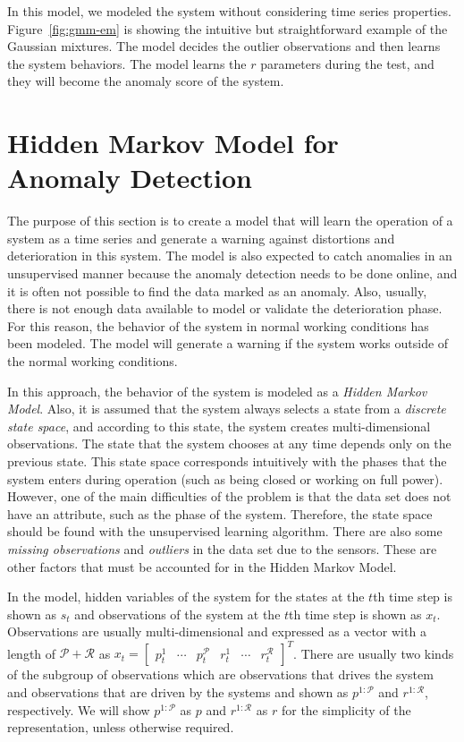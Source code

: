 In this model, we modeled the system without considering time series properties. Figure~\ref{fig:gmm-em} is showing the intuitive but straightforward example of the Gaussian mixtures. The model decides the outlier observations and then learns the system behaviors. The model learns the $r$ parameters during the test, and they will become the anomaly score of the system.

\section{Hidden Markov Model for Anomaly Detection}

The purpose of this section is to create a model that will learn the operation of a system as a time series and generate a warning against distortions and deterioration in this system. 
The model is also expected to catch anomalies in an unsupervised manner because the anomaly detection needs to be done online, and it is often not possible to find the data marked as an anomaly. 
Also, usually, there is not enough data available to model or validate the deterioration phase. 
For this reason, the behavior of the system in normal working conditions has been modeled. The model will generate a warning if the system works outside of the normal working conditions.

In this approach, the behavior of the system is modeled as a \textit{Hidden Markov Model}. 
Also, it is assumed that the system always selects a state from a \textit{discrete state space}, and according to this state, the system creates multi-dimensional observations. 
The state that the system chooses at any time depends only on the previous state. 
This state space corresponds intuitively with the phases that the system enters during operation (such as being closed or working on full power). 
However, one of the main difficulties of the problem is that the data set does not have an attribute, such as the phase of the system. 
Therefore, the state space should be found with the unsupervised learning algorithm. 
There are also some \textit{missing observations} and \textit{outliers} in the data set due to the sensors. 
These are other factors that must be accounted for in the Hidden Markov Model.

In the model, hidden variables of the system for the states at the $t$th time step is shown as $s_t$ and observations of the system at the $t$th time step is shown as $x_t$. 
Observations are usually multi-dimensional and expressed as a vector with a length of $\mathcal{P}+\mathcal{R}$ as $x_t = \begin{bmatrix} p_{t}^{1} & \cdots & p_{t}^{\mathcal{P}} & r_{t}^{1} & \cdots & r_{t}^{\mathcal{R}} \end{bmatrix}^T$. 
There are usually two kinds of the subgroup of observations which are observations that drives the system and observations that are driven by the systems and shown as $p^{1:\mathcal{P}}$ and $r^{1:\mathcal{R}}$, respectively. We will show $p^{1:\mathcal{P}}$ as $p$ and $r^{1:\mathcal{R}}$ as $r$ for the simplicity of the representation, unless otherwise required.

